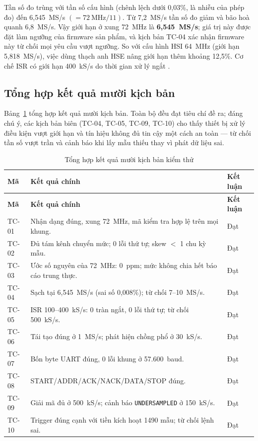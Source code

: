 Tần số đo trùng với tần số cấu hình (chênh lệch dưới 0,03\%, là nhiễu của phép đo) đến 6,545~MS/s \((=72~\text{MHz}/11)\). Từ 7,2~MS/s tần số đo giảm và bão hoà quanh 6,8~MS/s. Vậy giới hạn ở xung 72~MHz là \textbf{6,545~MS/s}; giá trị này được đặt làm ngưỡng  của firmware sản phẩm, và kịch bản TC-04 xác nhận firmware này từ chối mọi yêu cầu vượt ngưỡng. So với cấu hình HSI 64~MHz (giới hạn 5,818~MS/s), việc dùng thạch anh HSE nâng giới hạn thêm khoảng 12,5\%. Cơ chế ISR có giới hạn 400~kS/s do thời gian xử lý ngắt \cite{hil2026}.

\subsection{Tổng hợp kết quả mười kịch bản}\label{sec:test-summary}

Bảng~\ref{tab:test-summary} tổng hợp kết quả mười kịch bản. Toàn bộ đều đạt tiêu chí đề ra; đáng chú ý, các kịch bản biên (TC-04, TC-05, TC-09, TC-10) cho thấy thiết bị xử lý điều kiện vượt giới hạn và tín hiệu không đủ tin cậy một cách an toàn --- từ chối tần số vượt trần và cảnh báo khi lấy mẫu thiếu thay vì phát dữ liệu sai.

\begin{longtable}[]{@{}|
  >{\raggedright\arraybackslash}p{}
  |>{\raggedright\arraybackslash}p{}
  |>{\raggedright\arraybackslash}p{}|@{}}
\caption{Tổng hợp kết quả mười kịch bản kiểm thử}\label{tab:test-summary}\tabularnewline
\hline
\textbf{Mã} & \textbf{Kết quả chính} & \textbf{Kết luận} \\ \hline
\endfirsthead
\hline
\textbf{Mã} & \textbf{Kết quả chính} & \textbf{Kết luận} \\ \hline
\endhead
\endlastfoot
TC-01 & Nhận dạng đúng, xung 72~MHz, mã kiểm tra hợp lệ trên mọi khung. & Đạt \\ \hline
TC-02 & Đủ tám kênh chuyển mức; 0 lỗi thứ tự; skew $<$ 1 chu kỳ mẫu. & Đạt \\ \hline
TC-03 & Ước số nguyên của 72~MHz: 0~ppm; mức không chia hết báo cáo trung thực. & Đạt \\ \hline
TC-04 & Sạch tại 6,545~MS/s (sai số 0,008\%); từ chối 7--10~MS/s. & Đạt \\ \hline
TC-05 & ISR 100--400~kS/s: 0 tràn ngắt, 0 lỗi thứ tự; từ chối 500~kS/s. & Đạt \\ \hline
TC-06 & Tái tạo đúng ở 1~MS/s; phát hiện chồng phổ ở 30~kS/s. & Đạt \\ \hline
TC-07 & Bốn byte UART đúng, 0 lỗi khung ở 57.600~baud. & Đạt \\ \hline
TC-08 & START/ADDR/ACK/NACK/DATA/STOP đúng. & Đạt \\ \hline
TC-09 & Giải mã đủ ở 500~kS/s; cảnh báo \texttt{UNDERSAMPLED} ở 150~kS/s. & Đạt \\ \hline
TC-10 & Trigger đúng cạnh với tiền kích hoạt 1490 mẫu; từ chối lệnh sai. & Đạt \\ \hline
\end{longtable}

